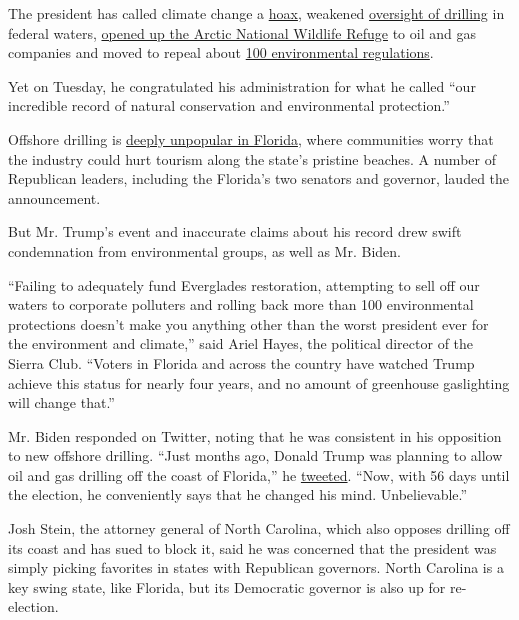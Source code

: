 The president has called climate change a
\href{https://www.nytimes3xbfgragh.onion/2017/06/02/us/politics/climate-change-trump-hoax-scott-pruitt.html}{hoax},
weakened
\href{https://www.nytimes3xbfgragh.onion/2019/05/02/climate/offshore-drilling-safety-rollback-deepwater-horizon.html}{oversight
of drilling} in federal waters,
\href{https://www.nytimes3xbfgragh.onion/2020/08/17/climate/alaska-oil-drilling-anwr.html}{opened
up the Arctic National Wildlife Refuge} to oil and gas companies and
moved to repeal about
\href{https://www.nytimes3xbfgragh.onion/interactive/2020/climate/trump-environment-rollbacks.html}{100
environmental regulations}.

Yet on Tuesday, he congratulated his administration for what he called
``our incredible record of natural conservation and environmental
protection.''

Offshore drilling is
\href{https://poll.qu.edu/florida/release-detail?ReleaseID=2605}{deeply
unpopular in Florida}, where communities worry that the industry could
hurt tourism along the state's pristine beaches. A number of Republican
leaders, including the Florida's two senators and governor, lauded the
announcement.

But Mr. Trump's event and inaccurate claims about his record drew swift
condemnation from environmental groups, as well as Mr. Biden.

``Failing to adequately fund Everglades restoration, attempting to sell
off our waters to corporate polluters and rolling back more than 100
environmental protections doesn't make you anything other than the worst
president ever for the environment and climate,'' said Ariel Hayes, the
political director of the Sierra Club. ``Voters in Florida and across
the country have watched Trump achieve this status for nearly four
years, and no amount of greenhouse gaslighting will change that.''

Mr. Biden responded on Twitter, noting that he was consistent in his
opposition to new offshore drilling. ``Just months ago, Donald Trump was
planning to allow oil and gas drilling off the coast of Florida,'' he
\href{https://twitter.com/JoeBiden/status/1303423093176774657}{tweeted}.
``Now, with 56 days until the election, he conveniently says that he
changed his mind. Unbelievable.''

Josh Stein, the attorney general of North Carolina, which also opposes
drilling off its coast and has sued to block it, said he was concerned
that the president was simply picking favorites in states with
Republican governors. North Carolina is a key swing state, like Florida,
but its Democratic governor is also up for re-election.

